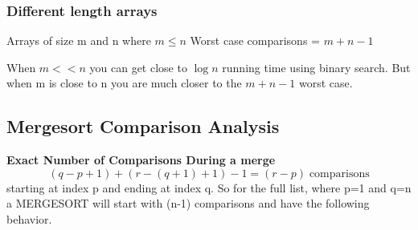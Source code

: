 \documentclass[english, 10pt]{article}
\begin{document}
\subsubsection{Different length arrays}
Arrays of size m and n where $m\le n$ Worst case comparisons = $m+n-1$

When $m<<n$ you can get close to $\log n$ running time using binary search. But when m is close to n you are much closer to the $m+n-1$ worst case.


\subsection{Mergesort Comparison Analysis}
\textbf{Exact Number of Comparisons During a merge}
$$ (q-p+1) + (r-(q+1)+1) -1 = (r-p)\; \text{comparisons} $$
starting at index p and ending at index q. So for the full list, where p=1 and q=n a MERGESORT will start with (n-1) comparisons and have the following behavior.
\end{document}
